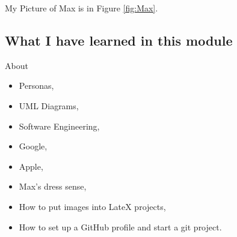 
My Picture of Max is in  Figure \ref{fig:Max}.

\subsection{What I have learned in this module}
About
\begin{itemize}
	\item Personas,
	\item UML Diagrams,
	\item Software Engineering,
	\item Google,
	\item Apple,
	\item Max's dress sense,
	\item How to put images into LateX projects,
	\item How to set up a GitHub profile and start a git project.
\end{itemize}

